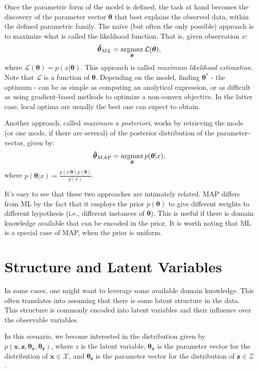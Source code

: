 Once the parametric form of the model is defined, the task at hand becomes the
discovery of the parameter vector $\bm{\theta}$ that best explains the observed
data, within the defined parametric family. The naïve (but often the only
possible) approach is to maximize what is called the likelihood function. That
is, given observation $x$:
\begin{align}
    \bm{\hat\theta}_{ML} = \argmax_{\bm{\theta}} \mathcal{L}(\bm{\theta}),
\end{align} where $\mathcal{L}(\bm{\theta}) = p(x | \bm{\theta})$.
This approach is called \emph{maximum likelihood estimation}. Note that $\mathcal{L}$
is a function of $\bm{\theta}$. Depending on the model, finding $\bm{\theta}^*$ - the optimum -
can be as simple as computing an analytical expression, or as difficult as using
gradient-based methods to optimize a non-convex objective. In the latter case,
local optima are usually the best one can expect to obtain.

Another approach, called \emph{maximum a posteriori}, works by retrieving the
mode (or one mode, if there are several) of the posterior distribution of the
parameter-vector, given by:
\begin{align}
    \bm{\hat\theta}_{MAP} = \argmax_{\bm{\theta}} p(\bm{\theta} | x),
\end{align} where $p(\bm{\theta} | x) = \frac{p(x |\bm{\theta})p(\bm{\theta})}{p(x)}$.

It's easy to see that these two approaches are intimately related. MAP differs
from ML by the fact that it employs the prior $p(\bm{\theta})$ to give different
weights to different hypothesis (i.e., different instances of $\bm{\theta}$). This
is useful if there is domain knowledge available that can be encoded in the
prior. It is worth noting that ML is a special case of MAP, when the prior is
uniform.

\section{Structure and Latent Variables}
\label{section:probmodellatvar}
In some cases, one might want to leverage some available domain knowledge. This
often translates into assuming that there is some latent structure in the data.
This structure is commonly encoded into latent variables and their influence over
the observable variables.

In this scenario, we become interested in the distribution given by
$p(\bm{x}, \bm{z}, \bm{\theta_x}, \bm{\theta_z})$, where $z$ is the latent variable, $\bm{\theta_x}$ is
the parameter vector for the distribution of $\bm{x} \in \bm{\mathcal{X}}$, and $\bm{\theta_z}$ is
the parameter vector for the distribution of $\bm{z} \in \bm{\mathcal{Z}}$.

